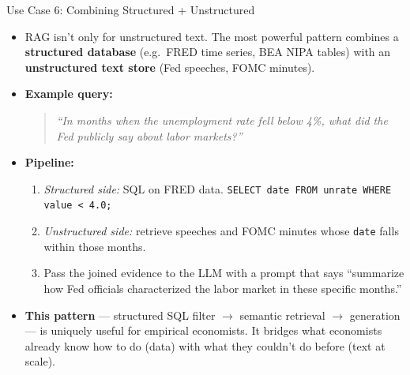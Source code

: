 \begin{frame}{Use Case 6: Combining Structured + Unstructured}
\begin{itemize}
\item RAG isn't only for unstructured text. The most powerful pattern combines a \textbf{structured database} (e.g.\ FRED time series, BEA NIPA tables) with an \textbf{unstructured text store} (Fed speeches, FOMC minutes).

\medskip
\item \textbf{Example query:}
\begin{quote}
\small\itshape
``In months when the unemployment rate fell below 4\%, what did the Fed publicly say about labor markets?''
\end{quote}

\medskip
\item \textbf{Pipeline:}
\begin{enumerate}
    \item \emph{Structured side:} SQL on FRED data. \texttt{SELECT date FROM unrate WHERE value < 4.0;}
    \item \emph{Unstructured side:} retrieve speeches and FOMC minutes whose \texttt{date} falls within those months.
    \item Pass the joined evidence to the LLM with a prompt that says ``summarize how Fed officials characterized the labor market in these specific months.''
\end{enumerate}

\medskip
\item \textbf{This pattern} --- structured SQL filter $\to$ semantic retrieval $\to$ generation --- is uniquely useful for empirical economists. It bridges what economists already know how to do (data) with what they couldn't do before (text at scale).
\end{itemize}
\end{frame}

